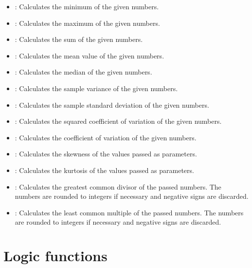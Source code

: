 \begin{itemize}

\item
{}:
Calculates the minimum of the given numbers.

\item
{}:
Calculates the maximum of the given numbers.

\item
{}:
Calculates the sum of the given numbers.

\item
{}:
Calculates the mean value of the given numbers.

\item
{}:
Calculates the median of the given numbers.

\item
{}:
Calculates the sample variance of the given numbers.

\item
{}:
Calculates the sample standard deviation of the given numbers.

\item
{}:
Calculates the squared coefficient of variation of the given numbers.

\item
{}:
Calculates the coefficient of variation of the given numbers.

\item
{}:
Calculates the skewness of the values passed as parameters.

\item
{}:
Calculates the kurtosis of the values passed as parameters.

\item
{}:
Calculates the greatest common divisor of the passed numbers. The numbers are rounded to integers if necessary and negative signs are discarded.

\item
{}:
Calculates the least common multiple of the passed numbers. The numbers are rounded to integers if necessary and negative signs are discarded.

\end{itemize}



\chapter{Logic functions}

